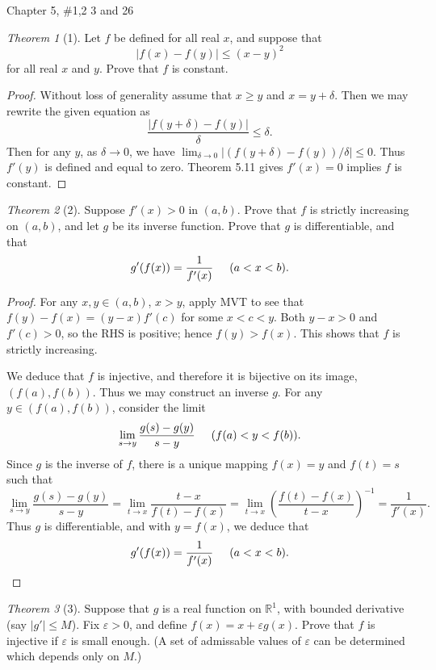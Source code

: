\documentclass[12pt]{article}
\theoremstyle{remark}
\theoremstyle{named}
\newtheorem*{theorem}{Theorem}
\newcommand{\e}{\varepsilon}
\newcommand{\R}{\mathbb R}
\begin{document}
Chapter 5, \#1,2 3 and 26
\begin{theorem}[1]
    Let \(f\) be defined for all real \(x\), and suppose that 
    \[|f(x) - f(y)| \le (x - y)^2\]
    for all real \(x\) and \(y\). Prove that \(f\) is constant.
\end{theorem}

\begin{proof}
    Without loss of generality assume that \(x \ge y\) and \(x = y + \delta\). Then we may rewrite the given equation as
    \[\frac{|f(y + \delta) - f(y)|}{\delta} \le \delta.\]
    Then for any \(y\), as \(\delta \to 0\), we have \(\lim_{\delta \to 0} |(f(y + \delta) - f(y)) / \delta| \le 0\). Thus \(f'(y)\) is defined and equal to zero. Theorem 5.11 gives \(f'(x) = 0\) implies \(f\) is constant.
\end{proof}

\begin{theorem}[2]
    Suppose \(f'(x) > 0\) in \((a, b)\). Prove that \(f\) is strictly increasing on \((a, b)\), and let \(g\) be its inverse function. Prove that \(g\) is differentiable, and that 
    \[g'(f(x)) = \frac{1}{f'(x)} \hspace{5mm} (a < x < b).\]
\end{theorem}

\begin{proof}
    For any \(x, y \in (a, b)\), \(x > y\), apply MVT to see that \(f(y) - f(x) = (y - x)f'(c)\) for some \(x < c < y\). Both \(y - x > 0\) and \(f'(c) > 0\), so the RHS is positive; hence \(f(y) > f(x)\). This shows that \(f\) is strictly increasing.

    We deduce that \(f\) is injective, and therefore it is bijective on its image, \((f(a), f(b))\). Thus we may construct an inverse \(g\). For any \(y \in (f(a), f(b))\), consider the limit 
    \[\lim_{s \to y}\frac{g(s) - g(y)}{s - y} \hspace{5mm} (f(a) < y < f(b)).\]
    Since \(g\) is the inverse of \(f\), there is a unique mapping \(f(x) = y\) and \(f(t) = s\) such that 
    \[\lim_{s \to y} \frac{g(s) - g(y)}{s - y} = \lim_{t \to x}\frac{t - x}{f(t) - f(x)} = \lim_{t \to x}\left(\frac{f(t) - f(x)}{t - x}\right)^{-1} = \frac{1}{f'(x)}.\]
    Thus \(g\) is differentiable, and with \(y = f(x)\), we deduce that
    \[g'(f(x)) = \frac{1}{f'(x)} \hspace{5mm} (a < x < b).\]
\end{proof}

\begin{theorem}[3]
    Suppose that \(g\) is a real function on \(\R^1\), with bounded derivative (say \(|g'| \le M\)). Fix \(\e > 0\), and define \(f(x) = x + \e g(x)\). Prove that \(f\) is injective if \(\e\) is small enough. (A set of admissable values of \(\e\) can be determined which depends only on \(M\).)
\end{theorem}
\end{document}
